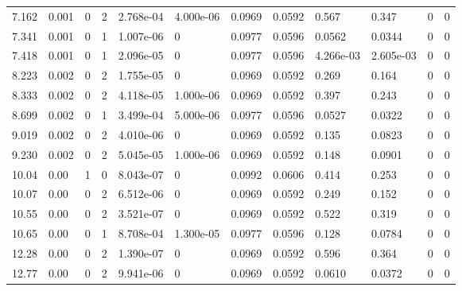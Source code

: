 \documentclass[preview]{standalone}
\begin{document}
{{\begin{tabular}{L{1.2cm}C{1.2cm} C{0.3cm}C{0.5cm} C{1.4cm}C{1.4cm} C{1.4cm}C{1.4cm} C{1.6cm}C{1.6cm} C{1.6cm}C{1.6cm}}
  7.162  &  0.001  & 0     &  2 &  2.768e-04  & 4.000e-06  &  0.0969&   0.0592& 0.567 & 0.347   &  0 & 0  \\ 
  7.341  &  0.001  & 0     &  1 &  1.007e-06  & 0  &  0.0977&   0.0596& 0.0562 & 0.0344   &  0 & 0  \\ 
  7.418  &  0.001  & 0     &  1 &  2.096e-05  & 0  &  0.0977&   0.0596& 4.266e-03 & 2.605e-03   &  0 & 0  \\ 
  8.223  &  0.002  & 0     &  2 &  1.755e-05  & 0  &  0.0969&   0.0592& 0.269 & 0.164   &  0 & 0  \\ 
  8.333  &  0.002  & 0     &  2 &  4.118e-05  & 1.000e-06  &  0.0969&   0.0592& 0.397 & 0.243   &  0 & 0  \\ 
  8.699  &  0.002  & 0     &  1 &  3.499e-04  & 5.000e-06  &  0.0977&   0.0596& 0.0527 & 0.0322   &  0 & 0  \\ 
  9.019  &  0.002  & 0     &  2 &  4.010e-06  & 0  &  0.0969&   0.0592& 0.135 & 0.0823   &  0 & 0  \\ 
  9.230  &  0.002  & 0     &  2 &  5.045e-05  & 1.000e-06  &  0.0969&   0.0592& 0.148 & 0.0901   &  0 & 0  \\ 
  10.04  &  0.00  & 1     &  0 &  8.043e-07  & 0  &  0.0992&   0.0606& 0.414 & 0.253   &  0 & 0  \\ 
  10.07  &  0.00  & 0     &  2 &  6.512e-06  & 0  &  0.0969&   0.0592& 0.249 & 0.152   &  0 & 0  \\ 
  10.55  &  0.00  & 0     &  2 &  3.521e-07  & 0  &  0.0969&   0.0592& 0.522 & 0.319   &  0 & 0  \\ 
  10.65  &  0.00  & 0     &  1 &  8.708e-04  & 1.300e-05  &  0.0977&   0.0596& 0.128 & 0.0784   &  0 & 0  \\ 
  12.28  &  0.00  & 0     &  2 &  1.390e-07  & 0  &  0.0969&   0.0592& 0.596 & 0.364   &  0 & 0  \\ 
  12.77  &  0.00  & 0     &  2 &  9.941e-06  & 0  &  0.0969&   0.0592& 0.0610 & 0.0372   &  0 & 0  \\ 
\hline 
\end{tabular} 

}}
\end{document}
